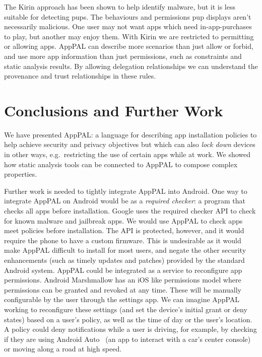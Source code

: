 \documentclass[]{llncs}
\begin{document}
The Kirin approach has been shown to help identify malware, but it is less suitable for detecting \acp{pup}.
The behaviours and permissions \ac{pup} displays aren't necessarily malicious.
One user may not want apps which need in-app-purchases to play, but another may enjoy them.
With Kirin we are restricted to permitting or allowing apps.
AppPAL can describe more scenarios than just allow or forbid, and use more app information than just permissions, such as constraints and static analysis results.
By allowing delegation relationships we can understand the provenance and trust relationships in these rules.

\section{Conclusions and Further Work}

We have presented AppPAL: a language for describing app installation policies to help achieve security and privacy objectives but which can also \emph{lock down} devices in other ways, e{.}g{.}~restricting the use of certain apps while at work.
We showed how static analysis tools can be connected to AppPAL to compose complex properties.

Further work is needed to tightly integrate AppPAL into Android.
One way to integrate AppPAL on Android would be as a \emph{required checker}: a program that checks all apps before installation.
Google uses the required checker API to check for known malware and jailbreak apps.
We would use AppPAL to check apps meet policies before installation.
The API is protected, however, and it would require the phone to have a custom firmware.
This is undesirable as it would make AppPAL difficult to install for most users, and negate the other security enhancements (such as timely updates and patches) provided by the standard Android system.
AppPAL could be integrated as a service to reconfigure app permissions.
Android Marshmallow has an iOS like permissions model where permissions can be granted and revoked at any time.
These will be manually configurable by the user through the settings app.
We can imagine AppPAL working to reconfigure these settings (and set the device's initial grant or deny states) based on a user's policy, as well as the time of day or the user's location.
A policy could deny notifications while a user is driving, for example, by checking if they are using Android Auto~\cite{AndroidAuto:uw} (an app to interact with a car's center console) or moving along a road at high speed.
\end{document}
